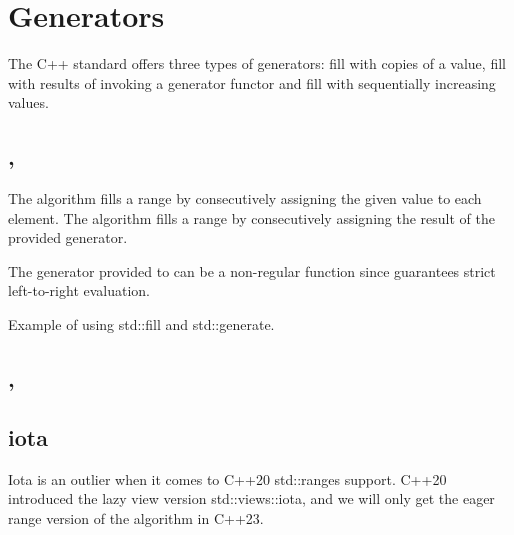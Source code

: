 \section{Generators}

The C++ standard offers three types of generators: fill with copies of a value, fill with results of invoking a generator functor and fill with sequentially increasing values.

\subsection{\texorpdfstring{, }{\texttt{std::fill}, \texttt{std::generate}}}

The  algorithm fills a range by consecutively assigning the given value to each element.
The  algorithm fills a range by consecutively assigning the result of the provided generator.



The generator provided to  can be a non-regular function since  guarantees strict left-to-right evaluation.

\begin{box-note}
\footnotesize Example of using std::fill and std::generate.
\tcblower
{}
\end{box-note}


\subsection{\texorpdfstring{, }{\texttt{std::fill\_n}, \texttt{std::generate\_n}}}



\subsection{iota}

Iota is an outlier when it comes to C++20 std::ranges support. C++20 introduced the lazy view version std::views::iota, and we will only get the eager range version of the algorithm in C++23.

